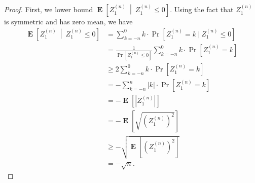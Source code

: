 \documentclass{article}
\DeclareMathOperator*{\Exp}{\mathbf{E}}
\begin{document}
\begin{proof}
First, we lower bound $\Exp \left[ Z^{(n)}_1 ~\middle|~ Z^{(n)}_1 \le 0 \right]$. Using the fact that $Z^{(n)}_1$ is symmetric and has zero mean, we have
\begin{align*}
\Exp \left[ Z^{(n)}_1 ~\middle|~ Z^{(n)}_1 \le 0 \right]
& = \sum_{k=-n}^0 k \cdot \Pr[Z^{(n)}_1 = k ~|~ Z^{(n)}_1 \le 0] \\
& = \frac{1}{\Pr[Z^{(n)}_1 \le 0]} \sum_{k=-n}^0 k \cdot \Pr[Z^{(n)}_1 = k] \\
& \ge 2 \sum_{k=-n}^0 k \cdot \Pr[Z^{(n)}_1 = k] \\
& = - \sum_{k=-n}^n |k| \cdot \Pr[Z^{(n)}_1 = k] \\
& = - \Exp[|Z^{(n)}_1|] \\
& = - \Exp \left[ \sqrt{ \left( Z^{(n)}_1 \right)^2} \right] \\
& \ge - \sqrt{\Exp \left[ \left( Z^{(n)}_1 \right)^2 \right]} \\
& = -\sqrt{n}.
\end{align*}


\end{proof}
\end{document}

